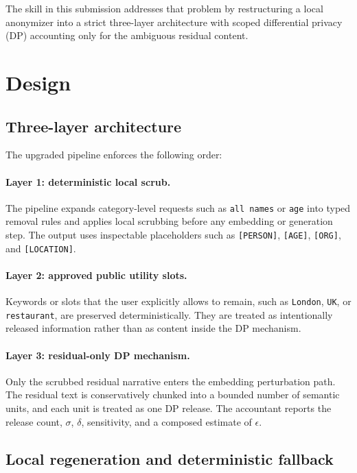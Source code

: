 \documentclass[11pt]{article}
\begin{document}
The skill in this submission addresses that problem by restructuring a local anonymizer into a strict three-layer architecture with scoped differential privacy (DP) accounting only for the ambiguous residual content.

\section{Design}

\subsection{Three-layer architecture}

The upgraded pipeline enforces the following order:

\paragraph{Layer 1: deterministic local scrub.}
The pipeline expands category-level requests such as \texttt{all names} or \texttt{age} into typed removal rules and applies local scrubbing before any embedding or generation step. The output uses inspectable placeholders such as \texttt{[PERSON]}, \texttt{[AGE]}, \texttt{[ORG]}, and \texttt{[LOCATION]}.

\paragraph{Layer 2: approved public utility slots.}
Keywords or slots that the user explicitly allows to remain, such as \texttt{London}, \texttt{UK}, or \texttt{restaurant}, are preserved deterministically. They are treated as intentionally released information rather than as content inside the DP mechanism.

\paragraph{Layer 3: residual-only DP mechanism.}
Only the scrubbed residual narrative enters the embedding perturbation path. The residual text is conservatively chunked into a bounded number of semantic units, and each unit is treated as one DP release. The accountant reports the release count, $\sigma$, $\delta$, sensitivity, and a composed estimate of $\epsilon$.

\subsection{Local regeneration and deterministic fallback}
\end{document}
